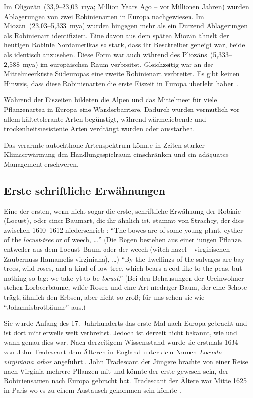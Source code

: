 \documentclass[twocolumn]{scrartcl}
\begin{document}
Im Oligozän~(33,9--23,03~mya; Million Years Ago -- vor Millionen
Jahren) wurden Ablagerungen von zwei Robinienarten in Europa
nachgewiesen. Im Miozän~(23,03--5,333~mya) wurden hingegen mehr als
ein Dutzend Ablagerungen als Robinienart identifiziert. Eine davon aus
dem späten Miozän ähnelt der heutigen Robinie Nordamerikas so stark,
dass ihr Beschreiber geneigt war, beide als identisch anzusehen. Diese
Form war auch während des Pliozäns~(5,333--2,588~mya) im europäischen
Raum verbreitet. Gleichzeitig war an der Mittelmeerküste Südeuropas
eine zweite Robinienart verbreitet. Es gibt keinen Hinweis, dass diese
Robinienarten die erste Eiszeit in Europa überlebt haben
\citep{berry1918robinie}.

Während der Eiszeiten bildeten die Alpen und das Mittelmeer für viele
Pflanzenarten in Europa eine Wanderbarriere. Dadurch wurden vermutlich
vor allem kältetolerante Arten begünstigt, während wärmeliebende und
trockenheitsresistente Arten verdrängt wurden oder ausstarben.

Das verarmte autochthone Artenspektrum könnte in Zeiten starker
Klimaerwärmung den Handlungsspielraum einschränken und ein adäquates
Management erschweren.

\subsection{Erste schriftliche Erwähnungen}

Eine der ersten, wenn nicht sogar die erste, schriftliche Erwähnung
der Robinie (Locust), oder einer Baumart, die ihr ähnlich ist, stammt
von Strachey, der dies zwischen 1610--1612 niederschrieb
\citep{strachey1610-1612historie}: \enquote{The bowes are of some
  young plant, eyther of the \emph{locust-tree} or of weech, \dots}
(Die Bögen bestehen aus einer jungen Pflanze, entweder aus dem
Locust--Baum oder der weech (witch-hazel -- virginischen Zaubernuss
Hamamelis virginiana), \dots) \enquote{By the dwellings of the
  salvages are bay-trees, wild roses, and a kind of low tree, which
  bears a cod like to the peas, but nothing so big: we take yt to be
  \emph{locust}.} (Bei den Behausungen der Ureinwohner stehen
Lorbeerbäume, wilde Rosen und eine Art niedriger Baum, der eine Schote
trägt, ähnlich den Erbsen, aber nicht so groß; für uns sehen sie wie
\enquote{Johannisbrotbäume} aus.)

Sie wurde Anfang des 17.~Jahrhunderts das erste Mal nach Europa
gebracht und ist dort mittlerweile weit verbreitet. Jedoch ist derzeit
nicht bekannt, wie und wann genau dies war. Nach derzeitigem
Wissensstand wurde sie erstmals 1634 von John Tradescant dem Älteren
in England unter dem Namen \emph{Locusta virginiana arbor} angeführt
\citep[S.~339]{gunther1922botanists}. John Tradescant der Jüngere
brachte von einer Reise nach Virginia mehrere Pflanzen mit und könnte
der erste gewesen sein, der Robiniensamen nach Europa gebracht
hat. Tradescant der Ältere war Mitte 1625 in Paris wo es zu einem
Austausch gekommen sein könnte \citep{ginter2022robinieGeschichte}.
\end{document}
